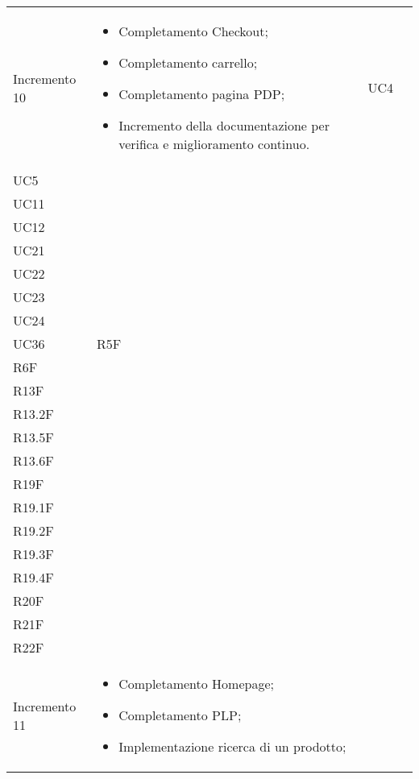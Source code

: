 \begin{longtable}{
    >{\centering}p{}
    >{\raggedright}p{}
    >{\centering}p{}
    >{\centering}p{}
    }
    Incremento 10                 & \vspace{-15px}
    \begin{itemize}
        \renewcommand\labelitemi{-}
        \item Completamento Checkout;
        \item Completamento carrello;
        \item Completamento pagina PDP;
        \item Incremento della documentazione per verifica e miglioramento continuo.
    \end{itemize}     & UC4                                                                                                                                                                                      \\ UC5 \\ UC11                                                                                                                                                                                     \\ UC12 \\ UC21 \\ UC22 \\ UC23 \\ UC24 \\ UC36 & R5F \\ R6F \\ R13F  \\ R13.2F \\ R13.5F \\ R13.6F \\ R19F \\ R19.1F \\ R19.2F \\ R19.3F \\ R19.4F \\ R20F \\ R21F \\ R22F
    \tabularnewline
    Incremento 11                 & \vspace{-15px}
    \begin{itemize}
        \renewcommand\labelitemi{-}
        \item Completamento Homepage;
        \item Completamento PLP;
        \item Implementazione ricerca di un prodotto;

\end{itemize}
\end{longtable}
